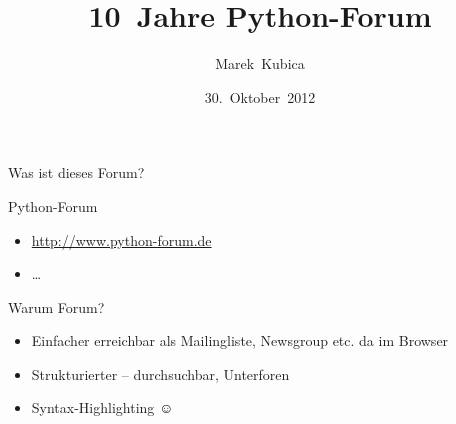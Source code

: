 \documentclass{beamer}
\title{10~Jahre Python-Forum}
\author{Marek~Kubica}
\institute{PyCon DE 2012}
\date{30.~Oktober~2012}
\begin{document}
\setmainfont{Latin Modern Roman}
\setsansfont{Latin Modern Sans}
\setmonofont{Latin Modern Mono}


\newcommand{\dejavu}[1]{{\setsansfont{DejaVu Sans}\selectfont #1}}

\begin{frame}[plain]
\end{frame}

\begin{frame}{Was ist dieses Forum?}
  \begin{block}{Python-Forum}
    \begin{itemize}
      \item \url{http://www.python-forum.de}
      \item …
    \end{itemize}
  \end{block}
  \begin{block}{Warum Forum?}
    \begin{itemize}
      \item Einfacher erreichbar als Mailingliste, Newsgroup etc. da im Browser
      \item Strukturierter – durchsuchbar, Unterforen
      \item Syntax-Highlighting \dejavu{☺}
    \end{itemize}
  \end{block}
\end{frame}
\end{document}
